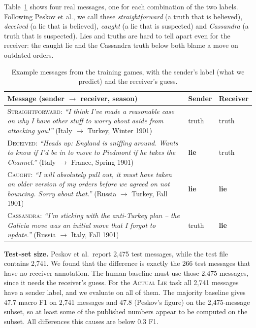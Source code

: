 \documentclass[conference]{IEEEtran}
\begin{document}
Table~\ref{tab:examples} shows four real messages, one for each combination of the two labels. Following Peskov et al., we call these \emph{straightforward} (a truth that is believed), \emph{deceived} (a lie that is believed), \emph{caught} (a lie that is suspected) and \emph{Cassandra} (a truth that is suspected). Lies and truths are hard to tell apart even for the receiver: the caught lie and the Cassandra truth below both blame a move on outdated orders.

\begin{table}[t]
\centering
\caption{Example messages from the training games, with the sender's label (what we predict) and the receiver's guess.}
\label{tab:examples}
\setlength{\tabcolsep}{3pt}
\renewcommand{\arraystretch}{1.15}
\begin{tabular}{>{\raggedright\arraybackslash}p{5.0cm}>{\centering\arraybackslash}p{1.0cm}>{\centering\arraybackslash}p{1.15cm}}
\toprule
Message (sender $\rightarrow$ receiver, season) & Sender & Receiver \\
\midrule
\textsc{Straightforward:} \textit{``I think I've made a reasonable case on why I have other stuff to worry about aside from attacking you!''} (Italy $\rightarrow$ Turkey, Winter 1901) & truth & truth \\
\addlinespace
\textsc{Deceived:} \textit{``Heads up: England is sniffing around. Wants to know if I'd be in to move to Piedmont if he takes the Channel.''} (Italy $\rightarrow$ France, Spring 1901) & \textbf{lie} & truth \\
\addlinespace
\textsc{Caught:} \textit{``I will absolutely pull out, it must have taken an older version of my orders before we agreed on not bouncing. Sorry about that.''} (Russia $\rightarrow$ Turkey, Fall 1901) & \textbf{lie} & \textbf{lie} \\
\addlinespace
\textsc{Cassandra:} \textit{``I'm sticking with the anti-Turkey plan -- the Galicia move was an initial move that I forgot to update.''} (Russia $\rightarrow$ Italy, Fall 1901) & truth & \textbf{lie} \\
\bottomrule
\end{tabular}
\end{table}

\textbf{Test-set size.} Peskov et al.\ report 2,475 test messages, while the test file contains 2,741. We found that the difference is exactly the 266 test messages that have no receiver annotation. The human baseline must use those 2,475 messages, since it needs the receiver's guess. For the \textsc{Actual Lie} task all 2,741 messages have a sender label, and we evaluate on all of them. The majority baseline gives 47.7 macro F1 on 2,741 messages and 47.8 (Peskov's figure) on the 2,475-message subset, so at least some of the published numbers appear to be computed on the subset. All differences this causes are below 0.3 F1.
\end{document}
